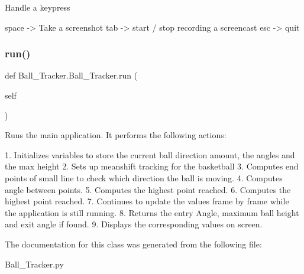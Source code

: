 \begin{DoxyVerb}    Handle a keypress

    space -> Take a screenshot
    tab -> start / stop recording a screencast
    esc -> quit
\end{DoxyVerb}
 \mbox{\label{classBall__Tracker_1_1Ball__Tracker_a836189dde622b6c508895dc113e4bbc1}} 
\subsubsection{\texorpdfstring{run()}{run()}}
{\footnotesize\ttfamily def Ball\+\_\+\+Tracker.\+Ball\+\_\+\+Tracker.\+run (\begin{DoxyParamCaption}\item[{}]{self }\end{DoxyParamCaption})}

\begin{DoxyVerb}Runs the main application. It performs the following actions:

1. Initializes variables to store the current ball direction amount, the angles and the max height
2. Sets up meanshift tracking for the basketball
3. Computes end points of small line to check which direction the ball is moving.
4. Computes angle between points.
5. Computes the highest point reached.
6. Computes the highest point reached.
7. Continues to update the values frame by frame while the application is still running.
8. Returns the entry Angle, maximum ball height and exit angle if found.
9. Displays the corresponding values on screen.
\end{DoxyVerb}
 

The documentation for this class was generated from the following file\+:\begin{DoxyCompactItemize}
\item 
Ball\+\_\+\+Tracker.\+py\end{DoxyCompactItemize}
